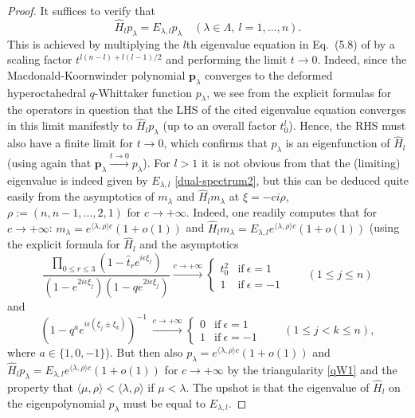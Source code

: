 \documentclass[reqno]{amsart}
\theoremstyle{remark}
\numberwithin{equation}{section}
\begin{document}
\begin{proof}
It suffices to verify that 
\begin{equation*}\label{devec}
\hat{H}_l p_\lambda=E_{\lambda,l}p_\lambda \quad(\lambda\in\Lambda,\ l=1,\ldots ,n).
\end{equation*}
This is achieved  by multiplying the $l$th eigenvalue equation in Eq.~(5.8) of
\cite{die:properties} by a scaling factor $t^{l (n-l)+l(l -1)/2}$ and performing the limit $t\to 0$. Indeed, since the Macdonald-Koornwinder polynomial $\mathbf{p}_\lambda$ converges  to the deformed hyperoctahedral $q$-Whittaker function $p_\lambda$, we see from the explicit formulas for the operators in question that the LHS of the cited eigenvalue equation converges in this limit manifestly to $\hat{H}_l p_\lambda$ (up to an overall factor $t_0^l$). Hence, the  RHS  must also have a finite limit for $t\to 0$, which confirms that $p_\lambda$ is  an eigenfunction of $\hat{H}_l $ (using again that $\mathbf{p}_\lambda\stackrel{t\to 0}{\longrightarrow} p_\lambda$).  For $l >1$ it is not obvious from \cite[Eq.~(5.5)]{die:properties}  that
 the (limiting) eigenvalue is indeed given by $E_{\lambda ,l}$ \eqref{dual-spectrum2}, but this can be deduced quite easily from the asymptotics of $m_\lambda$ and $\hat{H}_l m_\lambda$ 
at $\xi=-ci \rho$, $\rho :=(n,n-1,\ldots,2,1)$ for $c\to +\infty$. Indeed,
one readily computes that for $c\to +\infty$:
$m_\lambda=e^{\langle \lambda ,\rho\rangle c}(1+o(1))$ and
$\hat{H}_l m_\lambda =E_{\lambda ,l}e^{\langle \lambda ,\rho\rangle c}(1+o(1))$
(using the explicit formula for $\hat{H}_l$ and the asymptotics
$$  \frac{\prod_{0\leq r\leq 3} (1-\hat{t}_re^{i\epsilon \xi_j}) }{(1-e^{2i\epsilon \xi_j})  (1-q e^{2i\epsilon \xi_j}) }
\stackrel{c\to +\infty}{\longrightarrow} \begin{cases} t_0^2 &\text{if}\ \epsilon =1 \\  1&\text{if}\ \epsilon =-1
\end{cases}\qquad (1\leq j\leq n)
$$
 and
$$
(1-q^a e^{i\epsilon (\xi_j\pm \xi_k)})^{-1}\ \stackrel{c\to +\infty}{\longrightarrow}\begin{cases}
0 &\text{if}\ \epsilon =1 \\ 1 &\text{if}\ \epsilon =-1
\end{cases}
\qquad ( 1\leq j<k\leq n) ,
$$
where $a\in \{ 1,0,-1\} $).
But then also
$p_\lambda=e^{\langle \lambda ,\rho\rangle c}(1+o(1))$ and
$\hat{H}_l p_\lambda =E_{\lambda ,l}e^{\langle \lambda ,\rho\rangle c}(1+o(1))$ for $c\to +\infty$ by
 the triangularity \eqref{qW1} and the property that
$\langle \mu,\rho\rangle<\langle \lambda,\rho\rangle$ if $\mu<\lambda$. The upshot is that the eigenvalue of $\hat{H}_l$ on the eigenpolynomial $p_\lambda$ must be equal to $E_{\lambda,l}$.
\end{proof}
\end{document}
